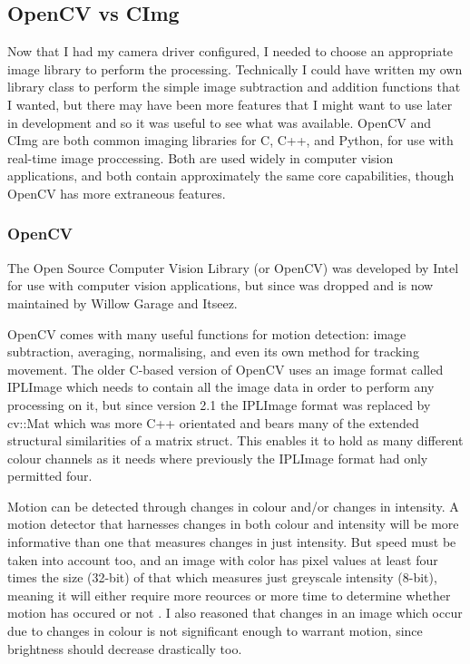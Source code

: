 \subsection{OpenCV vs CImg}
Now that I had my camera driver configured, I needed to choose an appropriate image library to perform the processing. Technically I could have written my own library class to perform the simple image subtraction and addition functions that I wanted, but there may have been more features that I might want to use later in development and so it was useful to see what was available. OpenCV and CImg are both common imaging libraries for C, C++, and Python, for use with real-time image proccessing.  Both are used widely in computer vision applications, and both contain approximately the same core capabilities, though OpenCV has more extraneous features.

\subsubsection{OpenCV}\label{opencvdocu}
The Open Source Computer Vision Library (or OpenCV) was developed by Intel for use with computer vision applications, but since was dropped and is now maintained by Willow Garage and Itseez.

OpenCV comes with many useful functions for motion detection: image subtraction, averaging, normalising, and even its own method for tracking movement. The older C-based version of OpenCV uses an image format called IPLImage which needs to contain all the image data in order to perform any processing on it, but since version 2.1 the IPLImage format was replaced by cv::Mat which was more C++ orientated and bears many of the extended structural similarities of a matrix struct. This enables it to hold as many different colour channels as it needs where previously the IPLImage format had only permitted four.

Motion can be detected through changes in colour and/or changes in intensity. A motion detector that harnesses changes in both colour and intensity will be more informative than one that measures changes in just intensity. But speed must be taken into account too, and an image with color has pixel values at least four times the size (32-bit) of that which measures just greyscale intensity (8-bit), meaning it will either require more reources or more time to determine whether motion has occured or not . I also reasoned that changes in an image which occur due to changes in colour is not significant enough to warrant motion, since brightness should decrease drastically too.

